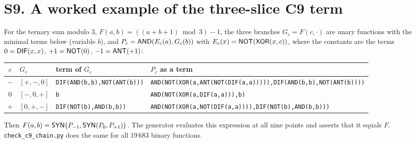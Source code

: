 \documentclass[10pt,a4paper]{article}
\begin{document}
\section*{S9. A worked example of the three-slice C9 term}
For the ternary sum modulo $3$, $F(a,b)=((a+b+1)\bmod 3)-1$, the three branches $G_c=F(c,\cdot)$ are unary functions with the minimal terms below (variable $b$), and $P_c=\mathsf{AND}(E_c(a),G_c(b))$ with $E_c(x)=\mathsf{NOT}(\mathsf{XOR}(x,c))$, where the constants are the terms $0=\mathsf{DIF}(x,x)$, $+1=\mathsf{NOT}(0)$, $-1=\mathsf{ANT}(+1)$:
\begin{center}\small\begin{longtable}{clp{4.4cm}p{7cm}}\toprule $c$&$G_c$&term of $G_c$&$P_c$ as a term\\\midrule\endhead
$-$&$[+,-,0]$&\texttt{DIF(\allowbreak AND(\allowbreak b,\allowbreak b),\allowbreak NOT(\allowbreak ANT(\allowbreak b)))}&\texttt{AND(\allowbreak NOT(\allowbreak XOR(\allowbreak a,\allowbreak ANT(\allowbreak NOT(\allowbreak DIF(\allowbreak a,\allowbreak a))))),\allowbreak DIF(\allowbreak AND(\allowbreak b,\allowbreak b),\allowbreak NOT(\allowbreak ANT(\allowbreak b))))}\\
$0$&$[-,0,+]$&\texttt{b}&\texttt{AND(\allowbreak NOT(\allowbreak XOR(\allowbreak a,\allowbreak DIF(\allowbreak a,\allowbreak a))),\allowbreak b)}\\
$+$&$[0,+,-]$&\texttt{DIF(\allowbreak NOT(\allowbreak b),\allowbreak AND(\allowbreak b,\allowbreak b))}&\texttt{AND(\allowbreak NOT(\allowbreak XOR(\allowbreak a,\allowbreak NOT(\allowbreak DIF(\allowbreak a,\allowbreak a)))),\allowbreak DIF(\allowbreak NOT(\allowbreak b),\allowbreak AND(\allowbreak b,\allowbreak b)))}\\
\bottomrule\end{longtable}\end{center}
Then $F(a,b)=\mathsf{SYN}\big(P_{-1},\mathsf{SYN}(P_0,P_{+1})\big)$. The generator evaluates this expression at all nine points and asserts that it equals $F$. \texttt{check\_c9\_chain.py} does the same for all $19\,683$ binary functions.
\end{document}
